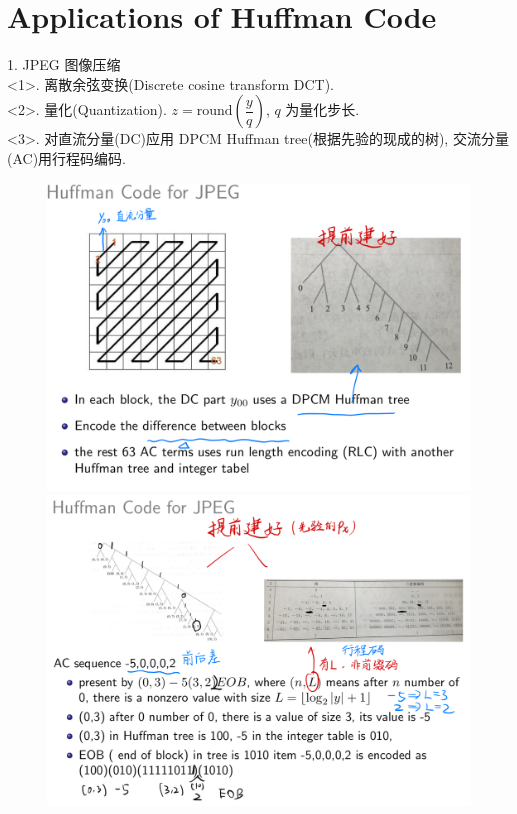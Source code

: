 \section{Applications of Huffman Code}

1. JPEG 图像压缩 \\
<1>. 离散余弦变换(Discrete cosine transform DCT). \\
<2>. 量化(Quantization). $z=\text{round}\left(\dfrac{y}{q}\right)$, $q$ 为量化步长. \\
<3>. 对直流分量(DC)应用 DPCM Huffman tree(根据先验的现成的树), 交流分量(AC)用行程码编码. \\

\begin{figure}[htbp]
    \centering
    \includegraphics[width=1.1\textwidth]{./figures/chapter3/jpeg1.png}
    \includegraphics[width=1.1\textwidth]{./figures/chapter3/jpeg2.png}
\end{figure}

